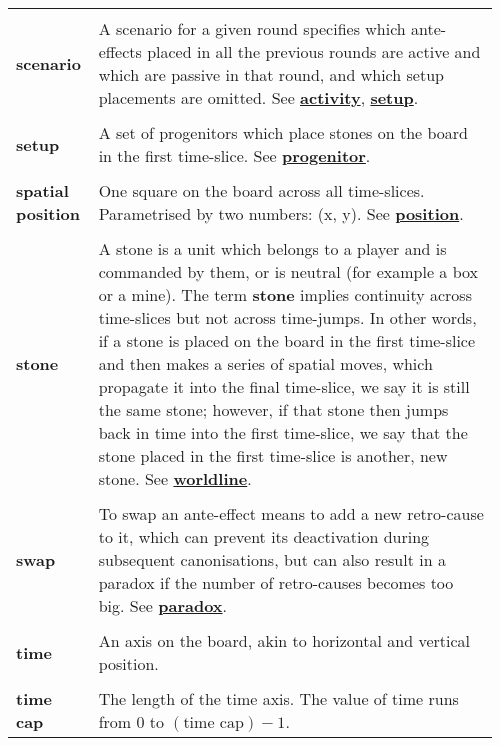{\begin{longtable}{ R{0.15\linewidth}  L{0.81\linewidth}  }
 \\* \textbf{scenario} & \parbox[t]{\linewidth}{A scenario for a given round specifies which ante-effects placed in all the previous rounds are active and which are passive in that round, and which setup placements are omitted. See \hyperref[glossary:activity]{\textbf{activity}}, \hyperref[glossary:setup]{\textbf{setup}}.}\\
 \\* \textbf{setup} & \parbox[t]{\linewidth}{A set of progenitors which place stones on the board in the first time-slice. See \hyperref[glossary:progenitor]{\textbf{progenitor}}.}\\
 \\* \textbf{spatial position} & \parbox[t]{\linewidth}{One square on the board across all time-slices. Parametrised by two numbers: (x, y). See \hyperref[glossary:position]{\textbf{position}}.}\\
 \\* \textbf{stone} & \parbox[t]{\linewidth}{A stone is a unit which belongs to a player and is commanded by them, or is neutral (for example a box or a mine). The term \textbf{stone} implies continuity across time-slices but not across time-jumps. In other words, if a stone is placed on the board in the first time-slice and then makes a series of spatial moves, which propagate it into the final time-slice, we say it is still the same stone; however, if that stone then jumps back in time into the first time-slice, we say that the stone placed in the first time-slice is another, new stone. See \hyperref[glossary:worldline]{\textbf{worldline}}.}\\
 \\* \textbf{swap} & \parbox[t]{\linewidth}{To swap an ante-effect means to add a new retro-cause to it, which can prevent its deactivation during subsequent canonisations, but can also result in a paradox if the number of retro-causes becomes too big. See \hyperref[glossary:paradox]{\textbf{paradox}}.}\\
 \\* \textbf{time} & \parbox[t]{\linewidth}{An axis on the board, akin to horizontal and vertical position.}\\
 \\* \textbf{time cap} & \parbox[t]{\linewidth}{The length of the time axis. The value of time runs from $0$ to $(\text{time cap}) - 1$.}\\

\end{longtable}}
